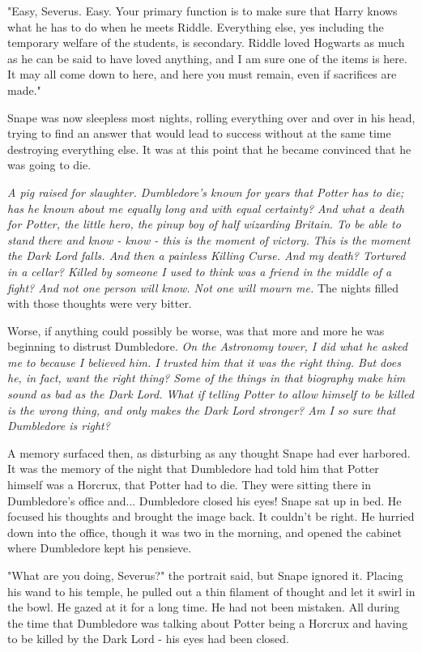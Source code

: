 \documentclass[a4paper,11pt]{article}
\begin{document}
"Easy, Severus. Easy. Your primary function is to make sure that Harry knows what he has to do when he meets Riddle. Everything else, yes including the temporary welfare of the students, is secondary. Riddle loved Hogwarts as much as he can be said to have loved anything, and I am sure one of the items is here. It may all come down to here, and here you must remain, even if sacrifices are made."

Snape was now sleepless most nights, rolling everything over and over in his head, trying to find an answer that would lead to success without at the same time destroying everything else. It was at this point that he became convinced that he was going to die.

\emph{A pig raised for slaughter. Dumbledore's known for years that Potter has to die; has he known about me equally long and with equal certainty? And what a death for Potter, the little hero, the pinup boy of half wizarding Britain. To be able to stand there and know - know - this is the moment of victory. This is the moment the Dark Lord falls. And then a painless Killing Curse. And my death? Tortured in a cellar? Killed by someone I used to think was a friend in the middle of a fight? And not one person will know. Not one will mourn me.} The nights filled with those thoughts were very bitter.

Worse, if anything could possibly be worse, was that more and more he was beginning to distrust Dumbledore.\emph{ On the Astronomy tower, I did what he asked me to because I believed him. I trusted him that it was the right thing. But does he, in fact, want the right thing? Some of the things in that biography make him sound as bad as the Dark Lord. What if telling Potter to allow himself to be killed is the wrong thing, and only makes the Dark Lord stronger? Am I so sure that Dumbledore is right?}

A memory surfaced then, as disturbing as any thought Snape had ever harbored. It was the memory of the night that Dumbledore had told him that Potter himself was a Horcrux, that Potter had to die. They were sitting there in Dumbledore's office and... Dumbledore closed his eyes! Snape sat up in bed. He focused his thoughts and brought the image back. It couldn't be right. He hurried down into the office, though it was two in the morning, and opened the cabinet where Dumbledore kept his pensieve.

"What are you doing, Severus?" the portrait said, but Snape ignored it. Placing his wand to his temple, he pulled out a thin filament of thought and let it swirl in the bowl. He gazed at it for a long time. He had not been mistaken. All during the time that Dumbledore was talking about Potter being a Horcrux and having to be killed by the Dark Lord - his eyes had been closed.
\end{document}
